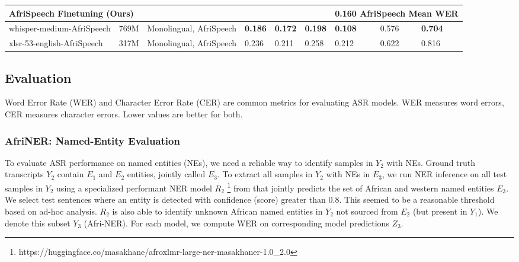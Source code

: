 \documentclass{INTERSPEECH2023}
\begin{document}
\begin{table*}[t]
\begin{tabular}{l|l|l|l|l|l|l|l|l}
\multicolumn{6}{l}{AfriSpeech Finetuning (Ours)} & \multicolumn{3}{l}{0.160 AfriSpeech Mean WER} \\
\hline
whisper-medium-AfriSpeech & 769M & Monolingual, AfriSpeech     & \textbf{0.186}  & \textbf{0.172}  & \textbf{0.198}  & \textbf{0.108}  & 0.576 & \textbf{0.704} \\
xlsr-53-english-AfriSpeech & 317M & Monolingual, AfriSpeech     & 0.236  & 0.211  & 0.258  & 0.212  & 0.622 & 0.816  \\

\bottomrule
\end{tabular}

\label{tab:models_benchmarks}
\end{table*}


\subsection{Evaluation}
Word Error Rate (WER) and Character Error Rate (CER) are common metrics for evaluating ASR models. WER measures word errors, CER measures character errors. Lower values are better for both.

\subsubsection{AfriNER: Named-Entity Evaluation}\label{section:ner}
To evaluate ASR performance on named entities (NEs), we need a reliable way to identify samples in $Y_2$ with NEs. Ground truth transcripts $Y_2$ contain $E_1$ and $E_2$ entities, jointly called $E_3$. To extract all samples in $Y_2$ with NEs in $E_3$, we run NER inference on all test samples in $Y_2$ using a specialized performant NER model $R_2$ \footnote{https://huggingface.co/masakhane/afroxlmr-large-ner-masakhaner-1.0\_2.0} from \cite{Adelani2022MasakhaNER2A} that jointly predicts the set of African and western named entities $E_3$. We select test sentences where an entity is detected with confidence (score) greater than 0.8. This seemed to be a reasonable threshold based on ad-hoc analysis. $R_2$ is also able to identify unknown African named entities in $Y_2$ not sourced from $E_2$ (but present in $Y_1$). We denote this subset $Y_3$ (Afri-NER). For each model, we compute WER on corresponding model predictions $Z_3$.
\end{document}
